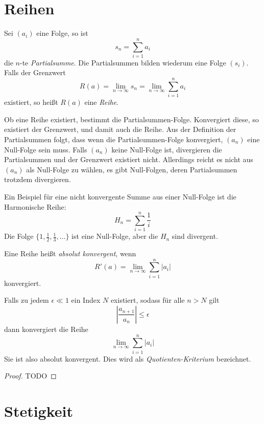 \section{Reihen}

\begin{definition}
Sei $(a_i)$ eine Folge, so ist 
\[
s_n = \sum_{i=1}^{n} a_i
\]
die $n$-te \emph{Partialsumme}. Die Partialsummen bilden wiederum eine Folge $(s_i)$. Falls der Grenzwert 
\[
R(a) = \lim_{n\rightarrow \infty} s_n = \lim_{n\rightarrow \infty} \sum_{i=1}^{n} a_i
\]
existiert, so heißt $R(a)$ eine \emph{Reihe}.
\end{definition}

Ob eine Reihe existiert, bestimmt die Partialsummen-Folge. Konvergiert diese, so existiert der Grenzwert, und damit auch die Reihe. Aus der Definition der Partialsummen folgt, dass wenn die Partialsummen-Folge konvergiert, $(a_n)$ eine Null-Folge sein muss. Falls $(a_n)$ keine Null-Folge ist, divergieren die Partialsummen und der Grenzwert  existiert nicht. Allerdings reicht es nicht aus $(a_n)$ als Null-Folge zu wählen, es gibt Null-Folgen, deren Partialsummen trotzdem divergieren. 

Ein Beispiel für eine nicht konvergente Summe aus einer Null-Folge ist die Harmonische Reihe:
\[
H_n = \sum_{i=1}^{n} \frac{1}{i}
\]
Die Folge $\lbrace 1, \frac{1}{2}, \frac{1}{3}, \dots \rbrace$ ist eine Null-Folge, aber die $H_n$ sind divergent.

\begin{definition}
Eine Reihe heißt \emph{absolut konvergent}, wenn 
\[
R'(a) = \lim_{n\rightarrow \infty} \sum_{i=1}^{n} \vert a_i \vert
\]
konvergiert.
\end{definition}

\begin{lemma}
Falls zu jedem $\epsilon \ll 1$ ein Index $N$ existiert, sodass für alle $n>N$ gilt
\[
\left\vert \frac{a_{n+1}}{a_n} \right\vert \le \epsilon
\]
dann konvergiert die Reihe 
\[
\lim\limits_{n\rightarrow \infty} \sum_{i=1}^{n} \vert a_i \vert
\]
Sie ist also absolut konvergent. Dies wird als \emph{Quotienten-Kriterium} bezeichnet.
\end{lemma}
\begin{proof}
TODO
\end{proof}


\section{Stetigkeit}

